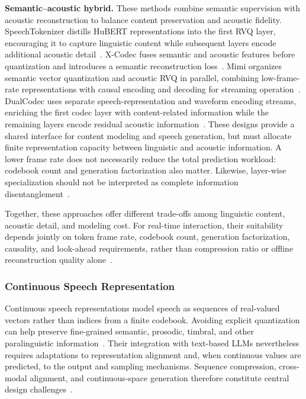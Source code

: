 \textbf{Semantic--acoustic hybrid.} These methods combine semantic supervision with acoustic reconstruction to balance content preservation and acoustic fidelity. SpeechTokenizer distills HuBERT representations into the first RVQ layer, encouraging it to capture linguistic content while subsequent layers encode additional acoustic detail~\citep{DBLP:conf/iclr/ZhangZLZQ24}. X-Codec fuses semantic and acoustic features before quantization and introduces a semantic reconstruction loss~\citep{DBLP:conf/aaai/YeSL00DKCPLGX25}. Mimi organizes semantic vector quantization and acoustic RVQ in parallel, combining low-frame-rate representations with causal encoding and decoding for streaming operation~\citep{DBLP:journals/corr/abs-2410-00037}. DualCodec uses separate speech-representation and waveform encoding streams, enriching the first codec layer with content-related information while the remaining layers encode residual acoustic information~\citep{DBLP:conf/interspeech/LiLLHWWZ025}. These designs provide a shared interface for content modeling and speech generation, but must allocate finite representation capacity between linguistic and acoustic information. A lower frame rate does not necessarily reduce the total prediction workload: codebook count and generation factorization also matter. Likewise, layer-wise specialization should not be interpreted as complete information disentanglement~\citep{DBLP:conf/iclr/ZhangZLZQ24,DBLP:journals/corr/abs-2410-00037,DBLP:conf/interspeech/LiLLHWWZ025}.

Together, these approaches offer different trade-offs among linguistic content, acoustic detail, and modeling cost. For real-time interaction, their suitability depends jointly on token frame rate, codebook count, generation factorization, causality, and look-ahead requirements, rather than compression ratio or offline reconstruction quality alone~\citep{DBLP:journals/taslp/ZeghidourLOST22,DBLP:journals/corr/abs-2410-00037}.


\subsubsection{Continuous Speech Representation}
\label{sec:continuous-speech-representation}

Continuous speech representations model speech as sequences of real-valued vectors rather than indices from a finite codebook. Avoiding explicit quantization can help preserve fine-grained semantic, prosodic, timbral, and other paralinguistic information~\citep{DBLP:journals/corr/abs-2310-04673,DBLP:conf/naacl/LiXSCK25}. Their integration with text-based LLMs nevertheless requires adaptations to representation alignment and, when continuous values are predicted, to the output and sampling mechanisms. Sequence compression, cross-modal alignment, and continuous-space generation therefore constitute central design challenges~\citep{DBLP:conf/emnlp/AlgayresANCSSD23,DBLP:conf/iclr/NachmaniLHSAMRS24,DBLP:journals/corr/abs-2310-04673,DBLP:journals/corr/abs-2412-04917}.

